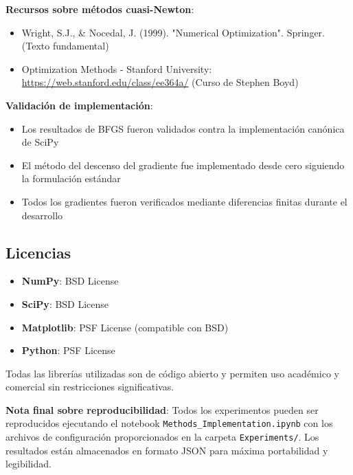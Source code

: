 \documentclass[12pt,a4paper]{article}
\begin{document}
\textbf{Recursos sobre métodos cuasi-Newton}:
\begin{itemize}
    \item Wright, S.J., \& Nocedal, J. (1999). "Numerical Optimization". Springer. (Texto fundamental)
    \item Optimization Methods - Stanford University: \url{https://web.stanford.edu/class/ee364a/} (Curso de Stephen Boyd)
\end{itemize}

\textbf{Validación de implementación}:
\begin{itemize}
    \item Los resultados de BFGS fueron validados contra la implementación canónica de SciPy
    \item El método del descenso del gradiente fue implementado desde cero siguiendo la formulación estándar
    \item Todos los gradientes fueron verificados mediante diferencias finitas durante el desarrollo
\end{itemize}

\subsection*{Licencias}

\begin{itemize}
    \item \textbf{NumPy}: BSD License
    \item \textbf{SciPy}: BSD License
    \item \textbf{Matplotlib}: PSF License (compatible con BSD)
    \item \textbf{Python}: PSF License
\end{itemize}

Todas las librerías utilizadas son de código abierto y permiten uso académico y comercial sin restricciones significativas.

\textbf{Nota final sobre reproducibilidad}: Todos los experimentos pueden ser reproducidos ejecutando el notebook \texttt{Methods\_Implementation.ipynb} con los archivos de configuración proporcionados en la carpeta \texttt{Experiments/}. Los resultados están almacenados en formato JSON para máxima portabilidad y legibilidad.
\end{document}
